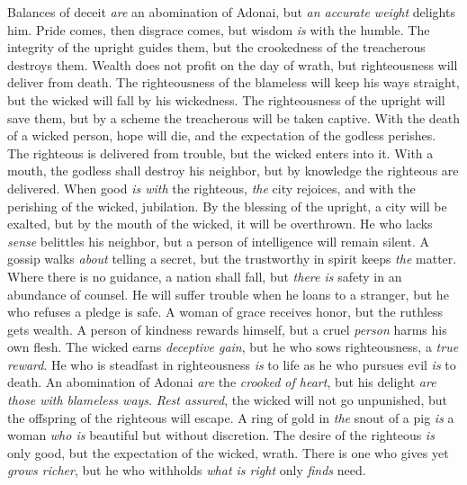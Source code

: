 \begin{biblechapter} %
\verse Balances of deceit \textit{are} an abomination of Adonai, 
but \textit{an accurate weight} delights him.
\verse Pride comes, then disgrace comes, 
but wisdom \textit{is} with the humble.
\verse The integrity of the upright guides them, 
but the crookedness of the treacherous destroys them.
\verse Wealth does not profit on the day of wrath, 
but righteousness will deliver from death.
\verse The righteousness of the blameless will keep his ways straight, 
but the wicked will fall by his wickedness.
\verse The righteousness of the upright will save them, 
but by a scheme the treacherous will be taken captive.
\verse With the death of a wicked person, hope will die, 
and the expectation of the godless perishes.
\verse The righteous is delivered from trouble, 
but the wicked enters into it.
\verse With a mouth, the godless shall destroy his neighbor, 
but by knowledge the righteous are delivered.
\verse When good \textit{is with} the righteous, \textit{the} city rejoices, 
and with the perishing of the wicked, jubilation.
\verse By the blessing of the upright, a city will be exalted, 
but by the mouth of the wicked, it will be overthrown.
\verse He who lacks \textit{sense} belittles his neighbor, 
but a person of intelligence will remain silent.
\verse A gossip walks \textit{about} telling a secret, 
but the trustworthy in spirit keeps \textit{the} matter.
\verse Where there is no guidance, a nation shall fall, 
but \textit{there is} safety in an abundance of counsel.
\verse He will suffer trouble when he loans to a stranger, 
but he who refuses a pledge is safe.
\verse A woman of grace receives honor, 
but the ruthless gets wealth.
\verse A person of kindness rewards himself, 
but a cruel \textit{person} harms his own flesh.
\verse The wicked earns \textit{deceptive gain}, 
but he who sows righteousness, a \textit{true reward}.
\verse He who is steadfast in righteousness \textit{is} to life 
as he who pursues evil \textit{is} to death.
\verse An abomination of Adonai \textit{are} the \textit{crooked of heart}, 
but his delight \textit{are} \textit{those with blameless ways}.
\verse \textit{Rest assured}, the wicked will not go unpunished, 
but the offspring of the righteous will escape.
\verse A ring of gold in \textit{the} snout of a pig 
\textit{is} a woman \textit{who is} beautiful but without discretion.
\verse The desire of the righteous \textit{is} only good, 
but the expectation of the wicked, wrath.
\verse There is one who gives yet \textit{grows richer}, 
but he who withholds \textit{what is right} only \textit{finds} need.

\end{biblechapter}
